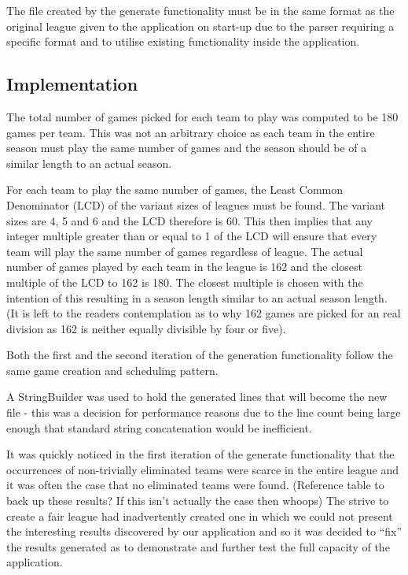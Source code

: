 The file created by the generate functionality must be in the same
format as the original league given to the application on start-up due
to the parser requiring a specific format and to utilise existing functionality inside the application.

\subsection{Implementation}
The total number of games picked for each team to play was computed to
be 180 games per team. This was not an arbitrary choice as each team
in the entire season must play the same number of games and the season
should be of a similar length to an actual season.

For each team to play the same number of games, the Least Common
Denominator (LCD) of the variant sizes of leagues must be found. The
variant sizes are 4, 5 and 6 and the LCD therefore is 60. This then
implies that any integer multiple greater than or equal to 1 of the
LCD will ensure that every team will play the same number of games
regardless of league. The actual number of games played by each team
in the league is 162 and the closest multiple of the LCD to 162 is 180.
The closest multiple is chosen with the intention of this resulting
in a season length similar to an actual season length. (It is left to
the readers contemplation as to why 162 games are picked for an real
division as 162 is neither equally divisible by four or five).

Both the first and the second iteration of the generation
functionality follow the same game creation and scheduling pattern.


A StringBuilder was used to hold the generated lines that will become
the new file - this was a decision for performance reasons due to the
line count being large enough that standard string concatenation would
be inefficient.

It was quickly noticed in the first iteration of the generate
functionality that the occurrences of non-trivially eliminated teams
were scarce in the entire league and it was often the case that no
eliminated teams were found. (Reference table to back up these
results? If this isn't actually the case then whoops) The strive to
create a fair league had inadvertently created one in which we could
not present the interesting results discovered by our application and
so it was decided to ``fix'' the results generated as to demonstrate
and further test the full capacity of the application.


